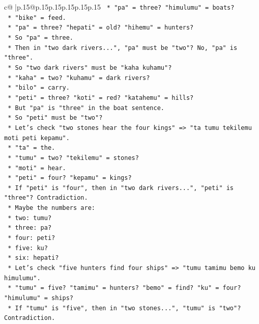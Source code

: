 \documentclass{article}
\begin{document}
{\begin{supertabular}{c@{$\;$}|p{.15\linewidth}@{}p{.15\linewidth}p{.15\linewidth}p{.15\linewidth}p{.15\linewidth}p{.15\linewidth}}
{{{\texttt{            *   "pa" = three? "himulumu" = boats?} \\
\texttt{            *   "bike" = feed.} \\
\texttt{            *   "pa" = three? "hepati" = old? "hihemu" = hunters?} \\
\texttt{            *   So "pa" = three.} \\
\texttt{        *   Then in "two dark rivers...", "pa" must be "two"? No, "pa" is "three".} \\
\texttt{        *   So "two dark rivers" must be "kaha kuhamu"?} \\
\texttt{        *   "kaha" = two? "kuhamu" = dark rivers?} \\
\texttt{        *   "bilo" = carry.} \\
\texttt{        *   "peti" = three? "koti" = red? "katahemu" = hills?} \\
\texttt{        *   But "pa" is "three" in the boat sentence.} \\
\texttt{        *   So "peti" must be "two"?} \\
\texttt{        *   Let's check "two stones hear the four kings" => "ta tumu tekilemu moti peti kepamu".} \\
\texttt{            *   "ta" = the.} \\
\texttt{            *   "tumu" = two? "tekilemu" = stones?} \\
\texttt{            *   "moti" = hear.} \\
\texttt{            *   "peti" = four? "kepamu" = kings?} \\
\texttt{        *   If "peti" is "four", then in "two dark rivers...", "peti" is "three"? Contradiction.} \\
\texttt{        *   Maybe the numbers are:} \\
\texttt{            *   two: tumu?} \\
\texttt{            *   three: pa?} \\
\texttt{            *   four: peti?} \\
\texttt{            *   five: ku?} \\
\texttt{            *   six: hepati?} \\
\texttt{        *   Let's check "five hunters find four ships" => "tumu tamimu bemo ku himulumu".} \\
\texttt{            *   "tumu" = five? "tamimu" = hunters? "bemo" = find? "ku" = four? "himulumu" = ships?} \\
\texttt{            *   If "tumu" is "five", then in "two stones...", "tumu" is "two"? Contradiction.} \\
}}}
\end{supertabular}}
\end{document}
